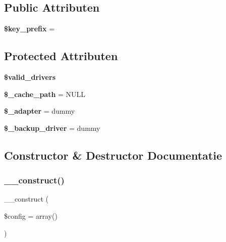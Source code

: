 \subsection*{Public Attributen}
\begin{DoxyCompactItemize}
\item 
\mbox{\label{class_c_i___cache_ac5ae5bfe56bac385a2687d7503487f38}} 
{\bfseries \$key\+\_\+prefix} = \textquotesingle{}\textquotesingle{}
\end{DoxyCompactItemize}
\subsection*{Protected Attributen}
\begin{DoxyCompactItemize}
\item 
{\bfseries \$valid\+\_\+drivers}
\item 
\mbox{\label{class_c_i___cache_ae9407d6ae1ddd132cca3c7f855f89dfe}} 
{\bfseries \$\+\_\+cache\+\_\+path} = N\+U\+LL
\item 
\mbox{\label{class_c_i___cache_a465f293474a3bbb7341af052f7de13d7}} 
{\bfseries \$\+\_\+adapter} = \textquotesingle{}dummy\textquotesingle{}
\item 
\mbox{\label{class_c_i___cache_a6e11e902e473d1345a4caa11236ac828}} 
{\bfseries \$\+\_\+backup\+\_\+driver} = \textquotesingle{}dummy\textquotesingle{}
\end{DoxyCompactItemize}


\subsection{Constructor \& Destructor Documentatie}
\mbox{\label{class_c_i___cache_af7f9493844d2d66e924e3c1df51ce616}} 
\subsubsection{\texorpdfstring{\_\_construct()}{\_\_construct()}}
{\footnotesize\ttfamily \+\_\+\+\_\+construct (\begin{DoxyParamCaption}\item[{}]{\$config = {\ttfamily array()} }\end{DoxyParamCaption})}

